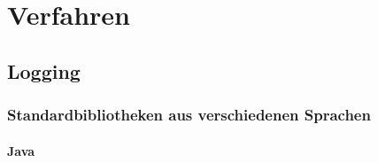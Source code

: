 \chapter{Verfahren}\label{ch:verfahren}


\section{Logging}\label{sec:logging-verfahren}

\subsection{Standardbibliotheken aus verschiedenen Sprachen}\label{subsec:standards-aus-verschiedenen-sprachen}

\subsubsection{Java}\label{subsubsec:java}

